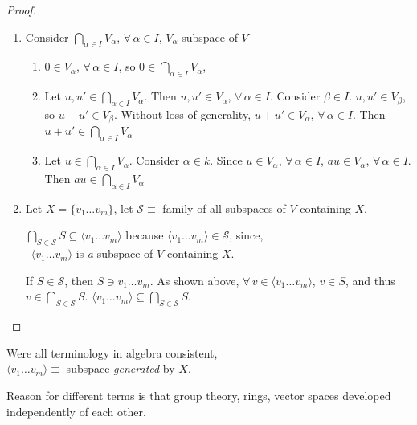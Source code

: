 \begin{proof}
\begin{enumerate}
	\item[(i)] Consider $\bigcap_{\alpha \in I} V_{\alpha}$, $\forall \, \alpha \in I$, $V_{\alpha} $ subspace of $V$
	\begin{enumerate}
		\item[(i)] $0\in V_{\alpha}$, $\forall \, \alpha \in I$, so $0\in \bigcap_{\alpha \in I} V_{\alpha}$,
		\item[(ii)] Let $u,u' \in \bigcap_{\alpha \in I} V_{\alpha}$. Then $u,u' \in V_{\alpha}$, $\forall \, \alpha \in I$. Consider $\beta \in I$. $u, u' \in V_{\beta}$, so $u+u' \in V_{\beta}$.  Without loss of generality, $u + u' \in V_{\alpha}$, $\forall \, \alpha \in I$.  Then $u+u' \in \bigcap_{\alpha \in I} V_{\alpha}$
		\item[(iii)] Let $u\in \bigcap_{\alpha \in I} V_{\alpha}$.  Consider $\alpha \in k$. Since $u\in V_{\alpha}$, $\forall \, \alpha \in I$, $au\in V_{\alpha}$, $\forall \, \alpha \in I$.  \\
		Then $au \in \bigcap_{\alpha \in I} V_{\alpha}$
	\end{enumerate}
\item[(ii)] Let $X = \lbrace v_1 \dots v_m \rbrace$, let $\mathcal{S} \equiv $ family of all subspaces of $V$ containing $X$. 

$\bigcap_{S \in \mathcal{S}} S \subseteq \langle v_1 \dots v_m \rangle$ because $\langle v_1 \dots v_m \rangle \in \mathcal{S}$, since, \\
\qquad \, $\langle v_1 \dots v_m \rangle$ is \emph{a} subspace of $V$ containing $X$. 

If $S\in \mathcal{S}$, then $S\ni v_1 \dots v_m$.  As shown above, $\forall \, v\in \langle v_1 \dots v_m \rangle$, $v\in S$, and thus $v\in \bigcap_{S\in \mathcal{S}} S$. $\langle v_1 \dots v_m \rangle \subseteq \bigcap_{S\in \mathcal{S}} S$.  
\end{enumerate}
	\end{proof}

Were all terminology in algebra consistent, \\
$\langle v_1 \dots v_m \rangle \equiv $ subspace \emph{generated} by $X$.  

Reason for different terms is that group theory, rings, vector spaces developed independently of each other.

